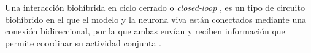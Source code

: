 Una interacción biohíbrida en ciclo cerrado o \textit{closed-loop} \cite{Varona2016a}, es un tipo de circuito biohíbrido en el que el modelo y la neurona viva están conectados mediante una conexión bidireccional, por la que ambas envían y reciben información que permite coordinar su actividad conjunta \cite{Amaducci2022}.
